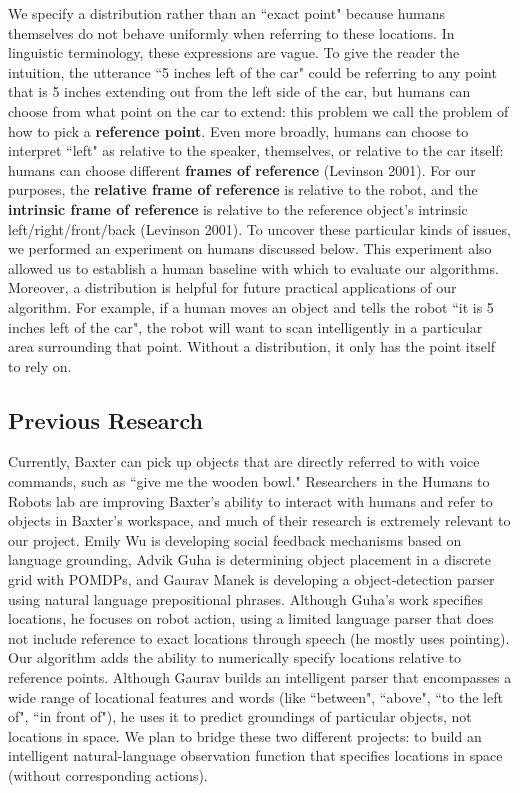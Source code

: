 \documentclass[12pt,letterpaper]{article}
\newcommand\tab[1][1cm]{\hspace*{#1}}
\begin{document}
We specify a distribution rather than an ``exact point" because humans themselves do not behave uniformly when referring to these locations. In linguistic terminology, these expressions are vague. To give the reader the intuition, the utterance ``5 inches left of the car" could be referring to any point that is 5 inches extending out from the left side of the car, but humans can choose from what point on the car to extend: this problem we call the problem of how to pick a \textbf{reference point}. Even more broadly, humans can choose to interpret ``left" as relative to the speaker, themselves, or relative to the car itself: humans can choose different \textbf{frames of reference} (Levinson 2001). For our purposes, the \textbf{relative frame of reference} is relative to the robot, and the \textbf{intrinsic frame of reference} is relative to the reference object's intrinsic left/right/front/back (Levinson 2001). To uncover these particular kinds of issues, we performed an experiment on humans discussed below. This experiment also allowed us to establish a human baseline with which to evaluate our algorithms.\\
\tab Moreover, a distribution is helpful for future practical applications of our algorithm. For example, if a human moves an object and tells the robot ``it is 5 inches left of the car", the robot will want to scan intelligently in a particular area surrounding that point. Without a distribution, it only has the point itself to rely on. 

\subsection{Previous Research}

\tab Currently, Baxter can pick up objects that are directly referred to with voice commands, such as ``give me the wooden bowl." Researchers in the Humans to Robots lab are improving Baxter's ability to interact with humans and refer to objects in Baxter's workspace, and much of their research is extremely relevant to our project. Emily Wu is developing social feedback mechanisms based on language grounding, Advik Guha is determining object placement in a discrete grid with POMDPs, and Gaurav Manek is developing a object-detection parser using natural language prepositional phrases. Although Guha's work specifies locations, he focuses on robot action, using a limited language parser that does not include reference to exact locations through speech (he mostly uses pointing). Our algorithm adds the ability to numerically specify locations relative to reference points. Although Gaurav builds an intelligent parser that encompasses a wide range of locational features and words (like ``between", ``above", ``to the left of", ``in front of"), he uses it to predict groundings of particular objects, not locations in space. We plan to bridge these two different projects: to build an intelligent natural-language observation function that specifies locations in space (without corresponding actions).
\end{document}
